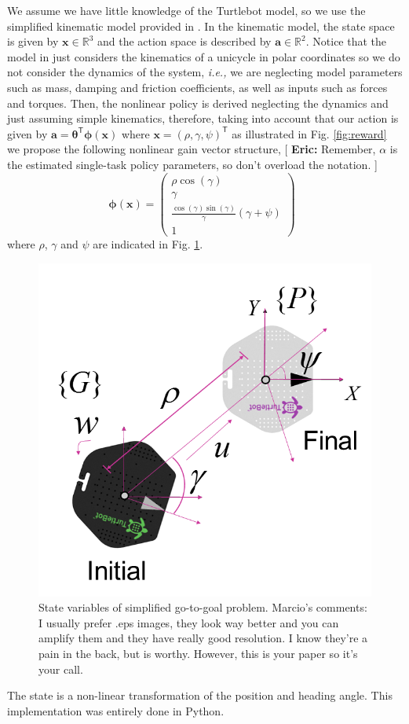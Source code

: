 \documentclass{aamas2016}
\renewcommand{\Re}{\mathbb{R}}
\newcommand{\transpose}{\text{$\mathsf{T}$}}
\newcommand{\note}[3]{{\color{#2} [ \ding{42} \textbf{#1:} {\small #3} ]}}
\newcommand{\comEric}[1]{\note{Eric}{blue}{#1}}
\begin{document}
We assume we have little knowledge of the Turtlebot model, so we use the simplified kinematic model provided in \cite{aicardi1994closed}.
In the kinematic model, the state space is given by $\boldsymbol{x} \in \Re^3$ and the action space is described by 
$\boldsymbol{a} \in \Re^2$. Notice that the model in \cite{aicardi1994closed} just considers the kinematics of a unicycle in polar coordinates
so we do not consider the dynamics of the system, \emph{i.e.,} we are neglecting model parameters such as mass, damping and friction 
coefficients, as well as inputs such as forces and torques. Then, the nonlinear policy is derived neglecting the dynamics and just assuming
simple kinematics, therefore, taking into account that our action is given by 
$\boldsymbol{a} = \boldsymbol{\theta}^\transpose\boldsymbol{\phi}(\boldsymbol{x})$
where $\boldsymbol{x} = (\rho,\gamma,\psi)^\transpose$ as illustrated in Fig. \ref{fig:reward} we propose the following nonlinear gain vector
structure,
\comEric{Remember, $\alpha$ is the estimated single-task policy parameters, so don't overload the notation.}
\begin{equation} \label{eqn:state}
	\boldsymbol{\phi}(\boldsymbol{x}) = \left(\begin{array}{c} \rho \cos(\gamma) \\ \gamma \\ \frac{\cos(\gamma)\sin(\gamma)}{\gamma}\left(\gamma + \psi \right) \\ 1 \end{array}\right) \enspace
\end{equation}
where $\rho$, $\gamma$ and $\psi$ are indicated in Fig. \ref{fig:numfeat}.



\begin{figure}[!htbp]
    \centering
        \includegraphics[width=.45\textwidth]{images/unicycle.png}
        \caption{State variables of simplified go-to-goal problem. {\color{red} Marcio's comments: I usually prefer .eps images, 
        they look way better and you can amplify them and they have really good resolution. I know they're a pain in the back, but is worthy.
        However, this is your paper so it's your call.}}\label{fig:numfeat}
\end{figure}
The state is a non-linear transformation of the position and heading angle. This implementation was entirely done in Python.
\end{document}
